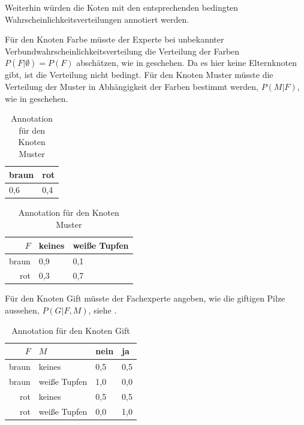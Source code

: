 \documentclass{llncs}
\begin{document}
Weiterhin würden die Koten mit den entsprechenden bedingten Wahrscheinlichkeitsverteilungen annotiert werden. 

Für den Knoten Farbe müsste der Experte bei unbekannter Verbundwahrscheinlichkeitsverteilung die Verteilung der Farben $P(F|\emptyset) = P(F)$ abschätzen, wie in  geschehen. Da es hier keine Elternknoten gibt, ist die Verteilung nicht bedingt. Für den Knoten Muster müsste die Verteilung der Muster in Abhängigkeit der Farben bestimmt werden, $P(M|F)$, wie in  geschehen.


\begin{table}[htb]
\begin{minipage}{0.45\textwidth}
\centering
\caption{\label{tab:nodecolor}Annotation für den Knoten Farbe}
\begin{tabular}{l|l}
  braun & rot    \\ \hline
  0,6   & 0,4    \\
\end{tabular}
\end{minipage}\hfill
\begin{minipage}{0.45\textwidth}
\centering
\caption{\label{tab:nodepattern}Annotation für den Knoten Muster}
\begin{tabular}{r|l|l}
  $F$   & keines & weiße Tupfen \\ \hline
  braun &    0,9 &          0,1 \\
  rot   &    0,3 &          0,7 \\
\end{tabular}
\end{minipage}
\end{table}




Für den Knoten Gift müsste der Fachexperte angeben, wie die giftigen Pilze aussehen, $P(G|F,M)$, siehe .


\begin{table}[htb]
\caption{\label{tab:nodepoison}Annotation für den Knoten Gift}
\centering
\begin{tabular}{rl|l|l}
  $F$   & $M$          & nein &   ja \\ \hline
  braun & keines       &  0,5 &  0,5 \\
  braun & weiße Tupfen &  1,0 &  0,0 \\
  rot   & keines       &  0,5 &  0,5 \\
  rot   & weiße Tupfen &  0,0 &  1,0 \\
\end{tabular}
\end{table}
\end{document}
